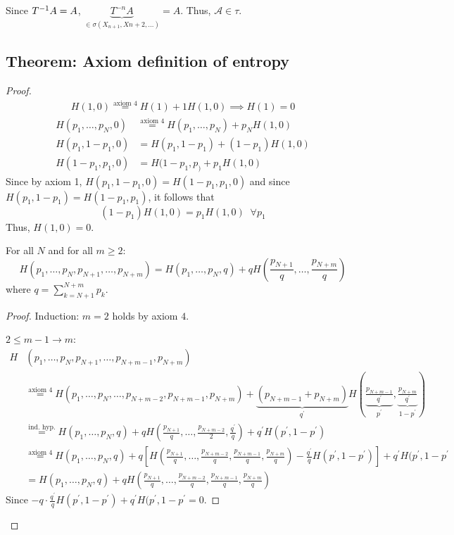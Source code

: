 \documentclass[mfit.tex]{subfiles}
\begin{document}
Since ${T}^{-1}A = A$, $\underbrace{T^{-n}A}_{\in \sigma(X_{n+1},X{n+2},\dots)} = A$.
Thus, $\mathcal{A} \in \tau$.

\subsection{Theorem: Axiom definition of entropy}

\begin{proof}
  \begin{align*}
    H(1,0) \overset{\text{axiom }4}{=} H(1) + 1 H(1,0) \implies H(1) = 0
  \end{align*}
  \begin{align*}
    H(p_1,\dots,p_N,0) &\overset{\text{axiom }4}{=} H(p_1,\dots,p_N) + p_N H(1,0) \\
    H(p_1, 1-p_1, 0) &= H(p_1,1-p_1) + (1-p_1)H(1,0) \\
    H(1-p_1, p_1,0) &= H(1- p_1,p_) + p_1 H(1,0)
  \end{align*}
  Since by axiom 1, $H(p_1, 1-p_1,0) = H(1-p_1,p_1,0)$ and since $H(p_1,1-p_1) = H(1-p_1,p_1)$, it follows that
  \[ (1-p_1) H(1,0) = p_1 H(1,0) \;\; \forall p_1 \]
  Thus, $H(1,0) = 0$.
  
  \begin{claim}
    For all $N$ and for all $m \geq 2$:
    \[ H(p_1,\dots,p_N,p_{N+1},\dots,p_{N+m}) = H(p_1,\dots,p_N,q) + q H\left( \frac{p_{N+1}}{q}, \dots, \frac{p_{N+m}}{q} \right) \]
    where $q = \sum_{k=N+1}^{N+m} p_k$.
  \end{claim}

  \begin{proof}
    Induction: $m=2$ holds by axiom $4$.

    $2 \leq m-1 \to m$:\\
    \begin{align*}
      H&(p_1,\dots,p_N,p_{N+1},\dots,p_{N+m-1},p_{N+m}) \\
      &\overset{\text{axiom }4}{=} H(p_1,\dots,p_N,\dots,p_{N+m-2},p_{N+m-1},p_{N+m}) 
      + \underbrace{(p_{N+m-1}+p_{N+m})}_{q^\prime} H\left( \underbrace{\frac{p_{N+m-1}}{q^\prime}}_{p^\prime}, \underbrace{\frac{p_{N+m}}{q^\prime}}_{1-p^\prime} \right) \\
      &\overset{\text{ind. hyp.}}{=} H(p_1,\dots,p_N,q) + q H \left( \frac{p_{N+1}}{q},\dots,\frac{p_{N+m-2}}{2}, \frac{q^\prime}{q} \right) + q^\prime H(p^\prime,1-p^\prime) \\
      &\overset{\text{axiom }4}{=} H(p_1,\dots,p_N,q) + q \left[ H \left( \frac{p_{N+1}}{q},\dots,\frac{p_{N+m-2}}{q},\frac{p_{N+m-1}}{q},\frac{p_{N+m}}{q} \right) - \frac{q^\prime}{q} H(p^\prime,1-p^\prime) \right] + q^\prime H(p^\prime, 1- p^\prime \\
      &= H(p_1,\dots,p_N,q) + q H \left( \frac{p_{N+1}}{q},\dots,\frac{p_{N+m-2}}{q},\frac{p_{N+m-1}}{q},\frac{p_{N+m}}{q} \right)
    \end{align*}
    Since $- q \cdot \frac{q^\prime}{q} H(p^\prime,1-p^\prime) + q^\prime H(p^\prime, 1- p^\prime = 0$.
  \end{proof}
  

\end{proof}
\end{document}
